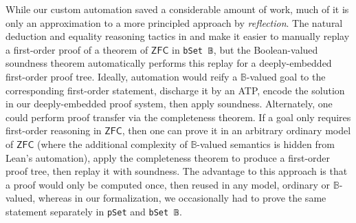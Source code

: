 \documentclass[sigplan,10pt,review, anonymous]{acmart}
\newcommand{\lil}{\lstinline}
\newcommand{\ZFC}{\mathsf{ZFC}}
\theoremstyle{definition}
\begin{document}
While our custom automation saved a considerable amount of work, much of it is only an approximation to a more principled approach by \emph{reflection}. The natural deduction and equality reasoning tactics in  and  make it easier to manually replay a first-order proof of a theorem of \(\ZFC\) in \lil{bSet 𝔹}, but the Boolean-valued soundness theorem automatically performs this replay for a deeply-embedded first-order proof tree. Ideally, automation would reify a \(\mathbb{B}\)-valued goal to the corresponding first-order statement, discharge it by an ATP, encode the solution in our deeply-embedded proof system, then apply soundness. Alternately, one could perform proof transfer via the completeness theorem. If a goal only requires first-order reasoning in \(\ZFC\), then one can prove it in an arbitrary ordinary model of \(\ZFC\) (where the additional complexity of \(\mathbb{B}\)-valued semantics is hidden from Lean's automation), apply the completeness theorem to produce a first-order proof tree, then replay it with soundness. The advantage to this approach is that a proof would only be computed once, then reused in any model, ordinary or \(\mathbb{B}\)-valued, whereas in our formalization, we occasionally had to prove the same statement separately in \lil{pSet} and \lil{bSet 𝔹}.





\end{document}
